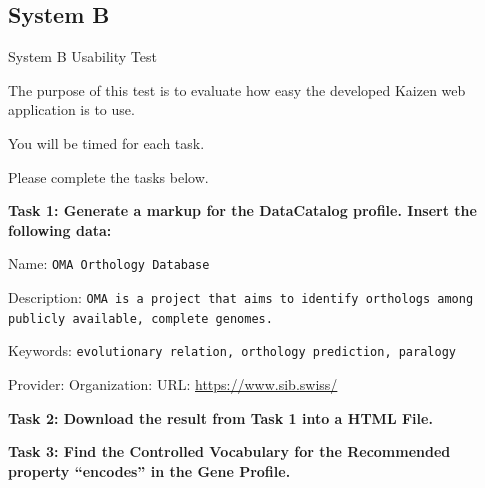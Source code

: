 \newpage
\subsection*{System B}

{
{\color{blue}System B Usability Test}

\noindent
The purpose of this test is to evaluate how easy the developed Kaizen web application is to use. 

\noindent
You will be timed for each task.

\noindent
Please complete the tasks below.

\noindent
\textbf{Task 1: Generate a markup for the DataCatalog profile. Insert the following data:}

\noindent
Name:\newline
\texttt{OMA Orthology Database}

\noindent
Description:\newline
\texttt{OMA is a project that aims to identify orthologs among publicly available, complete genomes.}

\noindent
Keywords:\newline
\texttt{evolutionary relation, orthology prediction, paralogy}

\noindent
Provider:\newline
\hspace*{35pt}Organization:\newline
\hspace*{70pt}URL: \url{https://www.sib.swiss/}

\noindent
\textbf{Task 2: Download the result from Task 1 into a HTML File.}

\noindent
\textbf{Task 3: Find the Controlled Vocabulary for the Recommended property “encodes” in the Gene Profile.}
}

\newpage
